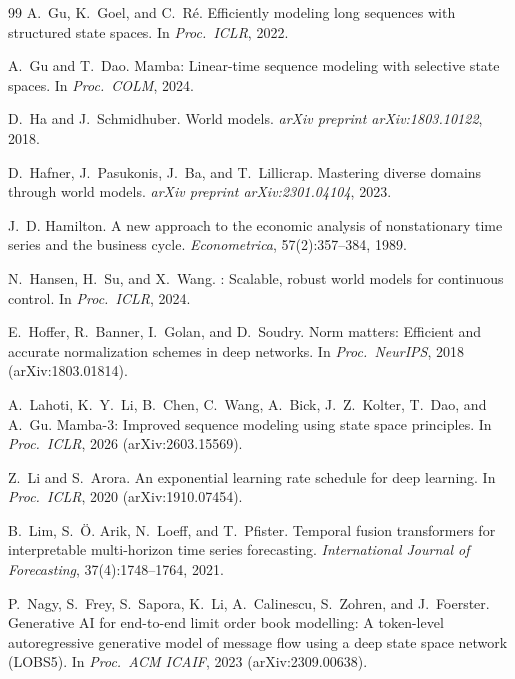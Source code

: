 \documentclass{article}
\begin{document}
\begin{thebibliography}{99}
A.~Gu, K.~Goel, and C.~R\'e.
\newblock Efficiently modeling long sequences with structured state spaces.
\newblock In \emph{Proc.\ ICLR}, 2022.

A.~Gu and T.~Dao.
\newblock Mamba: Linear-time sequence modeling with selective state spaces.
\newblock In \emph{Proc.\ COLM}, 2024.

D.~Ha and J.~Schmidhuber.
\newblock World models.
\newblock \emph{arXiv preprint arXiv:1803.10122}, 2018.

D.~Hafner, J.~Pasukonis, J.~Ba, and T.~Lillicrap.
\newblock Mastering diverse domains through world models.
\newblock \emph{arXiv preprint arXiv:2301.04104}, 2023.

J.~D. Hamilton.
\newblock A new approach to the economic analysis of nonstationary time series and the business cycle.
\newblock \emph{Econometrica}, 57(2):357--384, 1989.

N.~Hansen, H.~Su, and X.~Wang.
: Scalable, robust world models for continuous control.
\newblock In \emph{Proc.\ ICLR}, 2024.

E.~Hoffer, R.~Banner, I.~Golan, and D.~Soudry.
\newblock Norm matters: Efficient and accurate normalization schemes in deep networks.
\newblock In \emph{Proc.\ NeurIPS}, 2018 (arXiv:1803.01814).

A.~Lahoti, K.~Y.~Li, B.~Chen, C.~Wang, A.~Bick, J.~Z.~Kolter, T.~Dao, and A.~Gu.
\newblock Mamba-3: Improved sequence modeling using state space principles.
\newblock In \emph{Proc.\ ICLR}, 2026 (arXiv:2603.15569).

Z.~Li and S.~Arora.
\newblock An exponential learning rate schedule for deep learning.
\newblock In \emph{Proc.\ ICLR}, 2020 (arXiv:1910.07454).

B.~Lim, S.~\"O. Arik, N.~Loeff, and T.~Pfister.
\newblock Temporal fusion transformers for interpretable multi-horizon time series forecasting.
\newblock \emph{International Journal of Forecasting}, 37(4):1748--1764, 2021.

P.~Nagy, S.~Frey, S.~Sapora, K.~Li, A.~Calinescu, S.~Zohren, and J.~Foerster.
\newblock Generative {AI} for end-to-end limit order book modelling: A token-level autoregressive generative model of message flow using a deep state space network ({LOBS5}).
\newblock In \emph{Proc.\ ACM ICAIF}, 2023 (arXiv:2309.00638).


\end{thebibliography}
\end{document}
